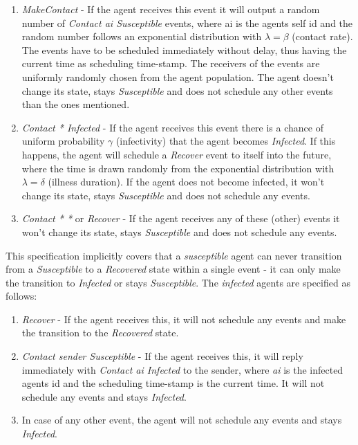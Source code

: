\begin{enumerate}
	\item \textit{MakeContact} - If the agent receives this event it will output a random number of \textit{Contact ai Susceptible} events, where ai is the agents self id and the random number follows an exponential distribution with $\lambda = \beta$ (contact rate). The events have to be scheduled immediately without delay, thus having the current time as scheduling time-stamp. The receivers of the events are uniformly randomly chosen from the agent population. The agent doesn't change its state, stays \textit{Susceptible} and does not schedule any other events than the ones mentioned.
	
	\item \textit{Contact * Infected} - If the agent receives this event there is a chance of uniform probability $\gamma$ (infectivity) that the agent becomes \textit{Infected}. If this happens, the agent will schedule a \textit{Recover} event to itself into the future, where the time is drawn randomly from the exponential distribution with $\lambda = \delta$ (illness duration). If the agent does not become infected, it won't change its state, stays \textit{Susceptible} and does not schedule any events.
	
	\item \textit{Contact * *} or \textit{Recover}  - If the agent receives any of these (other) events it won't change its state, stays \textit{Susceptible} and does not schedule any events.
\end{enumerate}

This specification implicitly covers that a \textit{susceptible} agent can never transition from a \textit{Susceptible} to a \textit{Recovered} state within a single event - it can only make the transition to \textit{Infected} or stays \textit{Susceptible}. The \textit{infected} agents are specified as follows:

\begin{enumerate}
	\item \textit{Recover} - If the agent receives this, it will not schedule any events and make the transition to the \textit{Recovered} state.
	
	\item \textit{Contact sender Susceptible} - If the agent receives this, it will reply immediately with \textit{Contact ai Infected} to the sender, where \textit{ai} is the infected agents id and the scheduling time-stamp is the current time. It will not schedule any events and stays \textit{Infected}.
	
	\item In case of any other event, the agent will not schedule any events and stays \textit{Infected}.
\end{enumerate}

